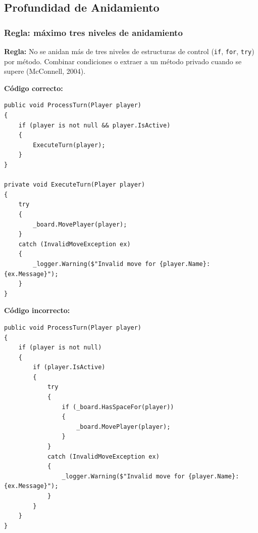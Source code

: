 \subsection{Profundidad de Anidamiento}

\subsubsection{Regla: máximo tres niveles de anidamiento}

\textbf{Regla:} No se anidan más de tres niveles de estructuras de control (\texttt{if}, \texttt{for}, \texttt{try}) por método. Combinar condiciones o extraer a un método privado cuando se supere (McConnell, 2004).

\textbf{Código correcto:}
\begin{lstlisting}[style=csharpstyle]
public void ProcessTurn(Player player)
{
    if (player is not null && player.IsActive)
    {
        ExecuteTurn(player);
    }
}

private void ExecuteTurn(Player player)
{
    try
    {
        _board.MovePlayer(player);
    }
    catch (InvalidMoveException ex)
    {
        _logger.Warning($"Invalid move for {player.Name}: {ex.Message}");
    }
}
\end{lstlisting}

\textbf{Código incorrecto:}
\begin{lstlisting}[style=csharpstyle]
public void ProcessTurn(Player player)
{
    if (player is not null)
    {
        if (player.IsActive)
        {
            try
            {
                if (_board.HasSpaceFor(player))
                {
                    _board.MovePlayer(player);
                }
            }
            catch (InvalidMoveException ex)
            {
                _logger.Warning($"Invalid move for {player.Name}: {ex.Message}");
            }
        }
    }
}
\end{lstlisting}
